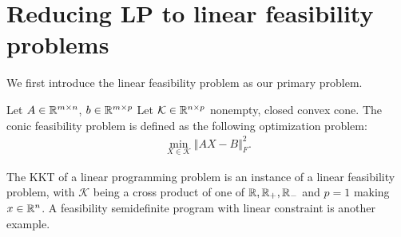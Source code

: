 \documentclass[12pt]{report}
\begin{document}
    \section{Reducing LP to linear feasibility problems}
        We first introduce the linear feasibility problem as our primary problem. 
        \begin{definition}\label{def:lcf-problem}
            Let $A\in \mathbb R^{m\times n}$, $b \in \mathbb R^{m\times p}$
            Let $\mathcal K \in \mathbb R^{n \times p}$ nonempty, closed convex cone. 
            The conic feasibility problem is defined as the following optimization problem: 
            \begin{align*}
                \min_{X \in \mathcal K} \Vert AX - B\Vert^2_F.
            \end{align*}
        \end{definition}
        The KKT of a linear programming problem is an instance of a linear feasibility problem, with $\mathcal K$ being a cross product of one of $\mathbb R, \mathbb R_+, \mathbb R_-$ and $p = 1$ making $x \in \mathbb R^{n}$. 
        A feasibility semidefinite program with linear constraint is another example. 
\end{document}
